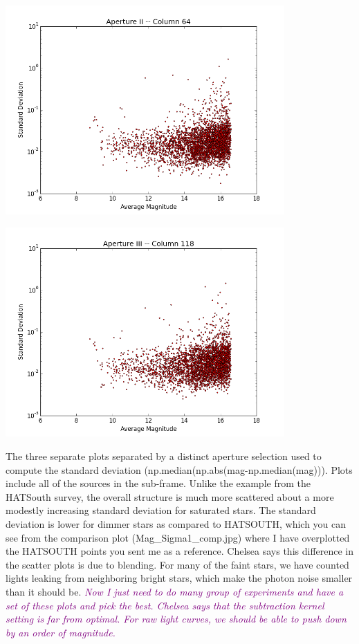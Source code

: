 \documentclass[11pt,letterpaper]{book} %
\begin{document}
\begin{center}
\includegraphics[width=0.8\textwidth]{Mag_Sigma2.png}\\ 
\end{center}
\begin{center}
\includegraphics[width=0.8\textwidth]{Mag_Sigma3.png}\\ 
\end{center}
The three separate plots separated by a distinct aperture selection used to compute the standard deviation (np.median(np.abs(mag-np.median(mag))). Plots include all of the sources in the sub-frame. 
Unlike the example from the HATSouth survey, the overall structure is much more scattered about a more modestly increasing standard deviation for saturated stars. The standard deviation is lower for dimmer stars as compared to HATSOUTH, which you can see from the comparison plot (Mag\_Sigma1\_comp.jpg) where I have overplotted the HATSOUTH points you sent me as a reference. 
Chelsea says this difference in the scatter plots is due to blending. For many of the faint stars, we have counted lights leaking from neighboring bright stars, which make the photon noise smaller than it should be. 
\textcolor{purple}{\textit{Now I just need to do many group of experiments and have a set of these plots and pick the best. 
Chelsea says that the subtraction kernel setting is far from optimal. For raw light curves, we should be able to push down by an order of magnitude.}}
\end{document}
